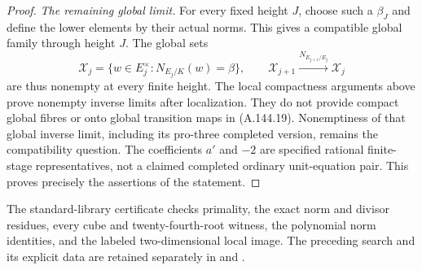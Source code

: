 \begin{proof}
\emph{The remaining global limit.}
For every fixed height \(J\), choose
such a \(\beta_J\) and define the
lower elements by their actual norms.
This gives a compatible global
family through height \(J\).
The global sets
\[
 \mathcal X_j=
       \{w\in E_j^\times:N_{E_j/K}(w)=\beta\},
       \qquad
 \mathcal X_{j+1}\xrightarrow{N_{E_{j+1}/E_j}}\mathcal X_j
\tag{A.144.19}
\]
are thus nonempty at every finite
height.
The local compactness arguments
above prove nonempty inverse limits
after localization.
They do not provide compact global
fibres or onto global transition
maps in (A.144.19).
Nonemptiness of that global inverse
limit, including its pro-three
completed version, remains the
compatibility question.
The coefficients \(a'\) and \(-2\)
are specified rational finite-stage
representatives, not a claimed
completed ordinary unit-equation pair.
This proves precisely the assertions
of the statement.
\end{proof}

The standard-library certificate
checks primality, the exact norm and divisor
residues, every cube and twenty-fourth-root
witness, the polynomial norm identities,
and the labeled two-dimensional local
image.
The preceding search and its explicit data
are retained separately in
and .
